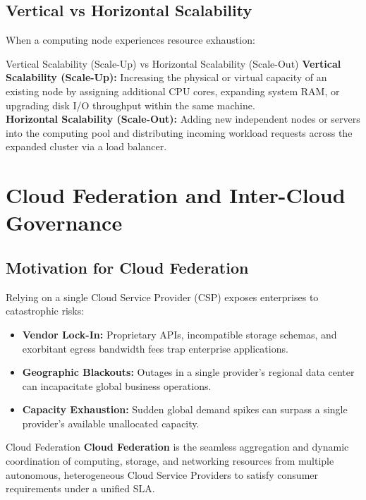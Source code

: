 \subsection{Vertical vs Horizontal Scalability}
When a computing node experiences resource exhaustion:
\begin{defbox}{Vertical Scalability (Scale-Up) vs Horizontal Scalability (Scale-Out)}
\textbf{Vertical Scalability (Scale-Up):} Increasing the physical or virtual capacity of an existing node by assigning additional CPU cores, expanding system RAM, or upgrading disk I/O throughput within the same machine.\\
\textbf{Horizontal Scalability (Scale-Out):} Adding new independent nodes or servers into the computing pool and distributing incoming workload requests across the expanded cluster via a load balancer.
\end{defbox}

\section{Cloud Federation and Inter-Cloud Governance}
\subsection{Motivation for Cloud Federation}
Relying on a single Cloud Service Provider (CSP) exposes enterprises to catastrophic risks:
\begin{itemize}[leftmargin=*]
  \item \textbf{Vendor Lock-In:} Proprietary APIs, incompatible storage schemas, and exorbitant egress bandwidth fees trap enterprise applications.
  \item \textbf{Geographic Blackouts:} Outages in a single provider's regional data center can incapacitate global business operations.
  \item \textbf{Capacity Exhaustion:} Sudden global demand spikes can surpass a single provider's available unallocated capacity.
\end{itemize}

\begin{defbox}{Cloud Federation}
\textbf{Cloud Federation} is the seamless aggregation and dynamic coordination of computing, storage, and networking resources from multiple autonomous, heterogeneous Cloud Service Providers to satisfy consumer requirements under a unified SLA.
\end{defbox}

